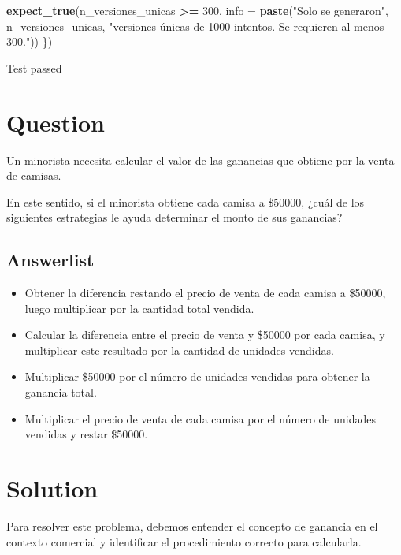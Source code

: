 \documentclass[
]{article}
\newenvironment{Shaded}{\begin{snugshade}}{\end{snugshade}}
\newcommand{\AttributeTok}[1]{\textcolor[rgb]{0.13,0.29,0.53}{#1}}
\newcommand{\DecValTok}[1]{\textcolor[rgb]{0.00,0.00,0.81}{#1}}
\newcommand{\FunctionTok}[1]{\textcolor[rgb]{0.13,0.29,0.53}{\textbf{#1}}}
\newcommand{\NormalTok}[1]{#1}
\newcommand{\SpecialCharTok}[1]{\textcolor[rgb]{0.81,0.36,0.00}{\textbf{#1}}}
\newcommand{\StringTok}[1]{\textcolor[rgb]{0.31,0.60,0.02}{#1}}
\providecommand{\tightlist}{%
  \setlength{\itemsep}{0pt}\setlength{\parskip}{0pt}}
\begin{document}
\begin{Shaded}
\begin{Highlighting}[]
  \FunctionTok{expect\_true}\NormalTok{(n\_versiones\_unicas }\SpecialCharTok{\textgreater{}=} \DecValTok{300}\NormalTok{,}
              \AttributeTok{info =} \FunctionTok{paste}\NormalTok{(}\StringTok{"Solo se generaron"}\NormalTok{, n\_versiones\_unicas,}
                          \StringTok{"versiones únicas de 1000 intentos. Se requieren al menos 300."}\NormalTok{))}
\NormalTok{\})}
\end{Highlighting}
\end{Shaded}

Test passed

\section{Question}\label{question}

Un minorista necesita calcular el valor de las ganancias que obtiene por
la venta de camisas.

En este sentido, si el minorista obtiene cada camisa a \$50000, ¿cuál de
los siguientes estrategias le ayuda determinar el monto de sus
ganancias?

\subsection{Answerlist}\label{answerlist}

\begin{itemize}
\tightlist
\item
  Obtener la diferencia restando el precio de venta de cada camisa a
  \$50000, luego multiplicar por la cantidad total vendida.
\item
  Calcular la diferencia entre el precio de venta y \$50000 por cada
  camisa, y multiplicar este resultado por la cantidad de unidades
  vendidas.
\item
  Multiplicar \$50000 por el número de unidades vendidas para obtener la
  ganancia total.
\item
  Multiplicar el precio de venta de cada camisa por el número de
  unidades vendidas y restar \$50000.
\end{itemize}

\section{Solution}\label{solution}

Para resolver este problema, debemos entender el concepto de ganancia en
el contexto comercial y identificar el procedimiento correcto para
calcularla.
\end{document}
